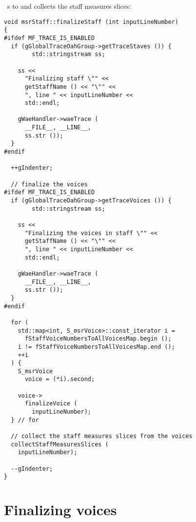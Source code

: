  \cascade\ s to  and collects the staff measures slices:
\begin{lstlisting}[language=CPlusPlus]
void msrStaff::finalizeStaff (int inputLineNumber)
{
#ifdef MF_TRACE_IS_ENABLED
  if (gGlobalTraceOahGroup->getTraceStaves ()) {
		std::stringstream ss;

    ss <<
      "Finalizing staff \"" <<
      getStaffName () << "\"" <<
      ", line " << inputLineNumber <<
      std::endl;

    gWaeHandler->waeTrace (
      __FILE__, __LINE__,
      ss.str ());
  }
#endif

  ++gIndenter;

  // finalize the voices
#ifdef MF_TRACE_IS_ENABLED
  if (gGlobalTraceOahGroup->getTraceVoices ()) {
		std::stringstream ss;

    ss <<
      "Finalizing the voices in staff \"" <<
      getStaffName () << "\"" <<
      ", line " << inputLineNumber <<
      std::endl;

    gWaeHandler->waeTrace (
      __FILE__, __LINE__,
      ss.str ());
  }
#endif

  for (
    std::map<int, S_msrVoice>::const_iterator i =
      fStaffVoiceNumbersToAllVoicesMap.begin ();
    i != fStaffVoiceNumbersToAllVoicesMap.end ();
    ++i
  ) {
    S_msrVoice
      voice = (*i).second;

    voice->
      finalizeVoice (
        inputLineNumber);
  } // for

  // collect the staff measures slices from the voices
  collectStaffMeasuresSlices (
    inputLineNumber);

  --gIndenter;
}
\end{lstlisting}


\section{Finalizing voices}


